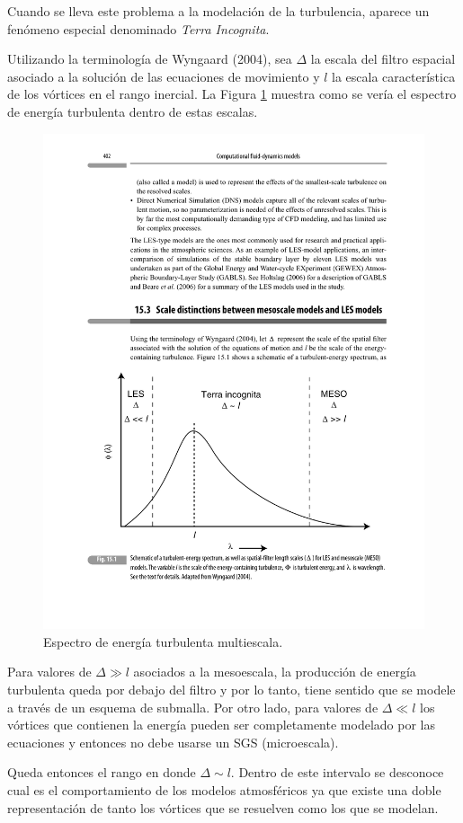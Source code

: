 Cuando se lleva este problema a la modelación de la turbulencia, aparece un fenómeno especial denominado \emph{Terra Incognita}.

Utilizando la terminología de Wyngaard (2004), sea $\Delta$ la escala del filtro espacial asociado a la solución de las ecuaciones de movimiento y $l$ la escala característica de los vórtices en el rango inercial. La Figura \ref{fig:terra} muestra como se vería el espectro de energía turbulenta dentro de estas escalas.
\begin{figure}[H]
	\centering
	\includegraphics[width=0.8\linewidth,trim={2cm 3cm 2cm 11.5cm},clip]{Imagenes/terra}
	\caption{Espectro de energía turbulenta multiescala.}
	\label{fig:terra}
\end{figure}

Para valores de $\Delta\gg l$ asociados a la mesoescala, la producción de energía turbulenta queda por debajo del filtro y por lo tanto, tiene sentido que se modele a través de un esquema de submalla. Por otro lado, para valores de $\Delta\ll l$ los vórtices que contienen la energía pueden ser completamente modelado por las ecuaciones y entonces no debe usarse un SGS (microescala).

Queda entonces el rango en donde $\Delta\sim l$. Dentro de este intervalo se desconoce cual es el comportamiento de los modelos atmosféricos ya que existe una doble representación de tanto los vórtices que se resuelven como los que se modelan.

